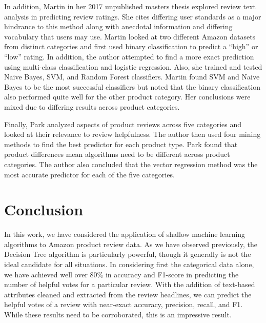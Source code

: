\documentclass[10pt, conference, compsocconf]{IEEEtran}
\begin{document}
In addition, Martin \cite{master} in her 2017 unpublished masters thesis explored review text analysis in predicting review ratings. She cites differing user standards as a major hindrance to this method along with anecdotal information and differing vocabulary that users may use. Martin looked at two different Amazon datasets from distinct categories and first used binary classification to predict a “high” or “low” rating. In addition, the author attempted to find a more exact prediction using multi-class classification and logistic regression. Also, she trained and tested Naive Bayes, SVM, and Random Forest classifiers. Martin found SVM and Naive Bayes to be the most successful classifiers but noted that the binary classification also performed quite well for the other product category. Her conclusions were mixed due to differing results across product categories.

Finally, Park \cite{Yoon} analyzed aspects of product reviews across five categories and looked at their relevance to review helpfulness. The author then used four mining methods to find the best predictor for each product type. Park found that product differences mean algorithms need to be different across product categories. The author also concluded that the vector regression method was the most accurate predictor for each of the five categories.

\vspace{-0.01cm}
\section{Conclusion}\label{conclusion}
\vspace{-0.01cm}

In this work, we have considered the application of shallow machine learning algorithms to Amazon product review data. As we have observed previously, the Decision Tree algorithm is particularly powerful, though it generally is not the ideal candidate for all situations. In considering first the categorical data alone, we have achieved well over 80\% in accuracy and F1-score in predicting the number of helpful votes for a particular review. With the addition of text-based attributes cleaned and extracted from the review headlines, we can predict the helpful votes of a review with near-exact accuracy, precision, recall, and F1. While these results need to be corroborated, this is an impressive result.


\vspace{-0.01cm}

\end{document}
